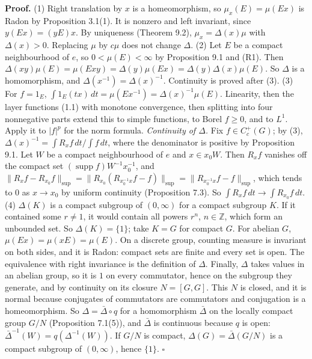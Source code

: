\documentclass[
  english,
  11pt,
  a4paper,
]{article}
\begin{document}
\textbf{Proof.} (1) Right translation by \(x\) is a homeomorphism, so
\(\mu_x(E)=\mu(Ex)\) is Radon by Proposition 3.1(1). It is nonzero and
left invariant, since \(y(Ex)=(yE)x\). By uniqueness (Theorem 9.2),
\(\mu_x=\Delta(x)\mu\) with \(\Delta(x)>0\). Replacing \(\mu\) by
\(c\mu\) does not change \(\Delta\). (2) Let \(E\) be a compact
neighbourhood of \(e\), so \(0<\mu(E)<\infty\) by Proposition 9.1 and
(R1). Then
\(\Delta(xy)\mu(E)=\mu(Exy)=\Delta(y)\mu(Ex)=\Delta(y)\Delta(x)\mu(E)\).
So \(\Delta\) is a homomorphism, and \(\Delta(x^{-1})=\Delta(x)^{-1}\).
Continuity is proved after (3). (3) For \(f=1_E\),
\(\int1_E(tx)\,dt=\mu(Ex^{-1})=\Delta(x)^{-1}\mu(E)\). Linearity, then
the layer functions (1.1) with monotone convergence, then splitting into
four nonnegative parts extend this to simple functions, to Borel
\(f\geq0\), and to \(L^1\). Apply it to \(|f|^p\) for the norm formula.
\emph{Continuity of \(\Delta\).} Fix \(f\in C_c^+(G)\); by (3),
\(\Delta(x)^{-1}=\int R_xf\,dt/\int f\,dt\), where the denominator is
positive by Proposition 9.1. Let \(W\) be a compact neighbourhood of
\(e\) and \(x\in x_0W\). Then \(R_xf\) vanishes off the compact set
\((\operatorname{supp}f)W^{-1}x_0^{-1}\), and
\(\|R_xf-R_{x_0}f\|_{\sup}=\|R_{x_0}(R_{x_0^{-1}x}f-f)\|_{\sup}=\|R_{x_0^{-1}x}f-f\|_{\sup}\),
which tends to \(0\) as \(x\to x_0\) by uniform continuity (Proposition
7.3). So \(\int R_xf\,dt\to\int R_{x_0}f\,dt\). (4) \(\Delta(K)\) is a
compact subgroup of \((0,\infty)\) for a compact subgroup \(K\). If it
contained some \(r\neq1\), it would contain all powers \(r^n\),
\(n\in\mathbb Z\), which form an unbounded set. So \(\Delta(K)=\{1\}\);
take \(K=G\) for compact \(G\). For abelian \(G\),
\(\mu(Ex)=\mu(xE)=\mu(E)\). On a discrete group, counting measure is
invariant on both sides, and it is Radon: compact sets are finite and
every set is open. The equivalence with right invariance is the
definition of \(\Delta\). Finally, \(\Delta\) takes values in an abelian
group, so it is \(1\) on every commutator, hence on the subgroup they
generate, and by continuity on its closure \(N=[G,G]\). This \(N\) is
closed, and it is normal because conjugates of commutators are
commutators and conjugation is a homeomorphism. So
\(\Delta=\bar\Delta\circ q\) for a homomorphism \(\bar\Delta\) on the
locally compact group \(G/N\) (Proposition 7.1(5)), and \(\bar\Delta\)
is continuous because \(q\) is open:
\(\bar\Delta^{-1}(W)=q(\Delta^{-1}(W))\). If \(G/N\) is compact,
\(\Delta(G)=\bar\Delta(G/N)\) is a compact subgroup of \((0,\infty)\),
hence \(\{1\}\). \(\square\)
\end{document}
